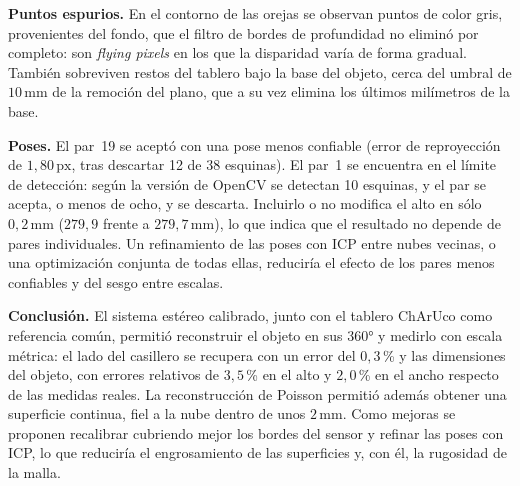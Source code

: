 \documentclass[10pt,a4paper,twocolumn]{article}
\newcommand{\px}{\,\mathrm{px}}
\newcommand{\mm}{\,\mathrm{mm}}
\begin{document}
\textbf{Puntos espurios.} En el contorno de las orejas se observan puntos de color gris, provenientes del fondo, que el filtro de bordes de profundidad no eliminó por completo: son \emph{flying pixels} en los que la disparidad varía de forma gradual. También sobreviven restos del tablero bajo la base del objeto, cerca del umbral de $10\mm$ de la remoción del plano, que a su vez elimina los últimos milímetros de la base.

\textbf{Poses.} El par~19 se aceptó con una pose menos confiable (error de reproyección de $1{,}80\px$, tras descartar 12 de 38 esquinas). El par~1 se encuentra en el límite de detección: según la versión de OpenCV se detectan 10 esquinas, y el par se acepta, o menos de ocho, y se descarta. Incluirlo o no modifica el alto en sólo $0{,}2\mm$ ($279{,}9$ frente a $279{,}7\mm$), lo que indica que el resultado no depende de pares individuales. Un refinamiento de las poses con ICP entre nubes vecinas, o una optimización conjunta de todas ellas, reduciría el efecto de los pares menos confiables y del sesgo entre escalas.

\textbf{Conclusión.} El sistema estéreo calibrado, junto con el tablero ChArUco como referencia común, permitió reconstruir el objeto en sus 360° y medirlo con escala métrica: el lado del casillero se recupera con un error del $0{,}3$\,\% y las dimensiones del objeto, con errores relativos de $3{,}5$\,\% en el alto y $2{,}0$\,\% en el ancho respecto de las medidas reales. La reconstrucción de Poisson permitió además obtener una superficie continua, fiel a la nube dentro de unos $2\mm$. Como mejoras se proponen recalibrar cubriendo mejor los bordes del sensor y refinar las poses con ICP, lo que reduciría el engrosamiento de las superficies y, con él, la rugosidad de la malla.
\end{document}
